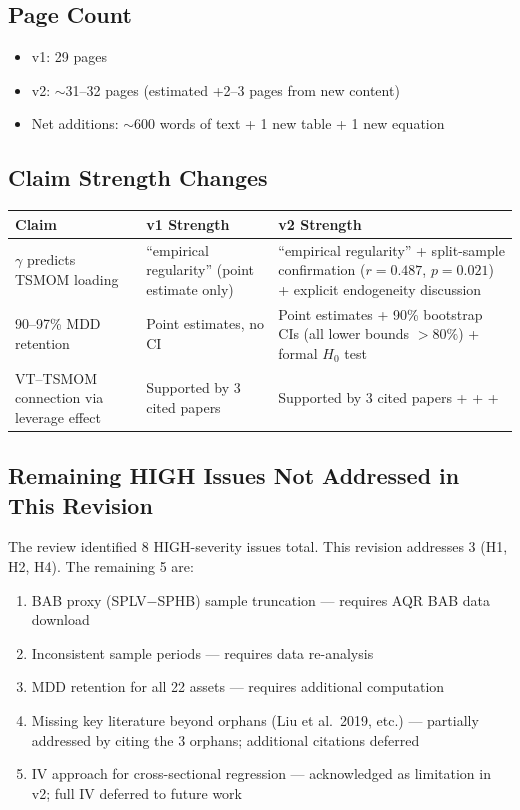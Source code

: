 \documentclass[12pt,a4paper]{article}
\begin{document}
\subsection{Page Count}

\begin{itemize}
\item v1: 29 pages
\item v2: $\sim$31--32 pages (estimated +2--3 pages from new content)
\item Net additions: $\sim$600 words of text + 1 new table + 1 new equation
\end{itemize}

\subsection{Claim Strength Changes}

\begin{center}
\begin{tabular}{p{5cm}p{4cm}p{4cm}}
\toprule
Claim & v1 Strength & v2 Strength \\
\midrule
$\gamma$ predicts TSMOM loading & ``empirical regularity'' (point estimate only) & ``empirical regularity'' + split-sample confirmation ($r = 0.487$, $p = 0.021$) + explicit endogeneity discussion \\
\midrule
90--97\% MDD retention & Point estimates, no CI & Point estimates + 90\% bootstrap CIs (all lower bounds $> 80\%$) + formal $H_0$ test \\
\midrule
VT--TSMOM connection via leverage effect & Supported by 3 cited papers & Supported by 3 cited papers + \citet{barroso2015} + \citet{daniel2016} + \citet{fleming2001} \\
\bottomrule
\end{tabular}
\end{center}

\subsection{Remaining HIGH Issues Not Addressed in This Revision}

The review identified 8 HIGH-severity issues total. This revision addresses 3 (H1, H2, H4). The remaining 5 are:

\begin{enumerate}
\item[\textbf{5.1}] BAB proxy (SPLV$-$SPHB) sample truncation --- requires AQR BAB data download
\item[\textbf{8.1}] Inconsistent sample periods --- requires data re-analysis
\item[\textbf{9.1}] MDD retention for all 22 assets --- requires additional computation
\item[\textbf{3.1}] Missing key literature beyond orphans (Liu et al.\ 2019, etc.) --- partially addressed by citing the 3 orphans; additional citations deferred
\item[\textbf{7.1}] IV approach for cross-sectional regression --- acknowledged as limitation in v2; full IV deferred to future work
\end{enumerate}
\end{document}
